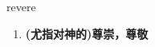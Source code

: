 
\begin{frame}
{\huge revere}
\begin{center}
\begin{enumerate}\Large
  \item \textbf{(尤指对神的)尊崇，尊敬}
\end{enumerate}
\end{center}
\end{frame}
